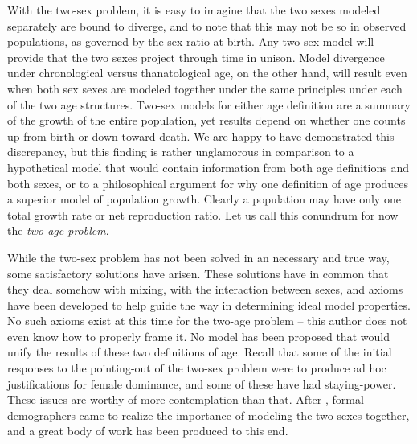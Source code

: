 With the two-sex problem, it is easy to imagine that the two sexes modeled
separately are bound to diverge, and to note that this may not be so in
observed populations, as governed by the sex ratio at birth. Any two-sex
model will provide that the two sexes project through time in unison. Model
divergence under chronological versus thanatological age, on the other hand,
will result even when both sex sexes are modeled together under the same principles under each
of the two age structures. Two-sex models for either age definition are a
summary of the growth of the entire population, yet results depend on whether
one counts up from birth or down toward death. We are happy to have demonstrated
this discrepancy, but this finding is rather unglamorous in comparison to a
hypothetical model that would contain information from both age definitions and
both sexes, or to a philosophical argument for why one definition of age
produces a superior model of population growth. Clearly a population may
have only one total growth rate or net reproduction ratio. Let us call this
conundrum for now the \textit{two-age problem}.

While the two-sex problem has not been solved in an necessary and true way, some
satisfactory solutions have arisen. These solutions have in common that they
deal somehow with mixing, with the interaction between sexes, and axioms have
been developed to help guide the way in determining ideal model properties. No
such axioms exist at this time for the two-age problem -- this author does not
even know how to properly frame it. No model has been proposed
that would unify the results of these two definitions of age. Recall that some 
of the initial responses to the pointing-out of the two-sex problem
were to produce ad hoc justifications for female dominance, and some of these
have had staying-power. These issues are worthy of more contemplation than that.
After \citet{karmel1947relations}, formal demographers came to realize the
importance of modeling the two sexes together, and a great body 
of work has been produced to this end. 

\FloatBarrier